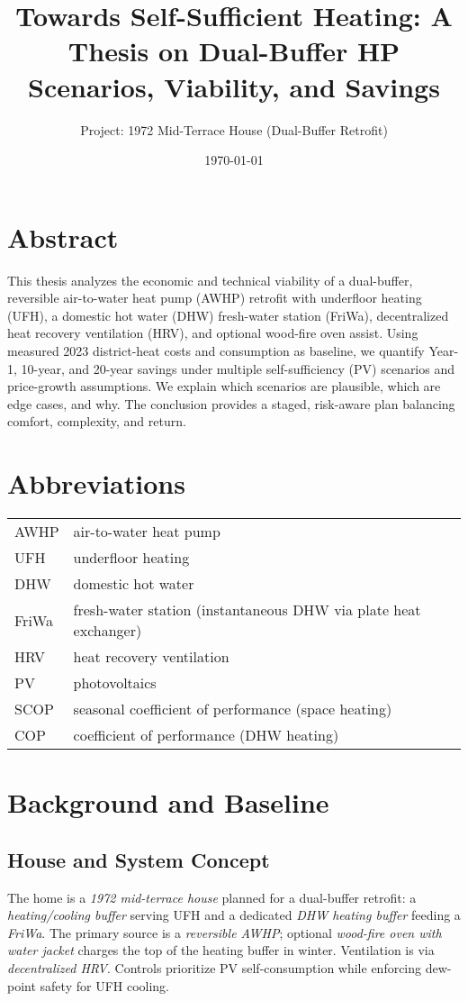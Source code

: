 \documentclass[12pt,oneside]{report}
\title{Towards Self-Sufficient Heating: A Thesis on Dual-Buffer HP Scenarios, Viability, and Savings}
\author{Project: 1972 Mid-Terrace House (Dual-Buffer Retrofit)}
\date{\today}
\begin{document}
\maketitle
\tableofcontents
\clearpage

\chapter*{Abstract}
This thesis analyzes the economic and technical viability of a dual-buffer, reversible air-to-water heat pump (AWHP) retrofit with underfloor heating (UFH), a domestic hot water (DHW) fresh-water station (FriWa), decentralized heat recovery ventilation (HRV), and optional wood-fire oven assist. Using measured 2023 district-heat costs and consumption as baseline, we quantify Year-1, 10-year, and 20-year savings under multiple self-sufficiency (PV) scenarios and price-growth assumptions. We explain which scenarios are plausible, which are edge cases, and why. The conclusion provides a staged, risk-aware plan balancing comfort, complexity, and return.

\chapter{Abbreviations}
\begin{longtable}{@{}ll@{}}
\toprule
AWHP & air-to-water heat pump \\
UFH & underfloor heating \\
DHW & domestic hot water \\
FriWa & fresh-water station (instantaneous DHW via plate heat exchanger) \\
HRV & heat recovery ventilation \\
PV & photovoltaics \\
SCOP & seasonal coefficient of performance (space heating) \\
COP & coefficient of performance (DHW heating) \\
\bottomrule
\end{longtable}

\chapter{Background and Baseline}
\section{House and System Concept}
The home is a \emph{1972 mid-terrace house} planned for a dual-buffer retrofit: a \emph{heating/cooling buffer} serving UFH and a dedicated \emph{DHW heating buffer} feeding a \emph{FriWa}. The primary source is a \emph{reversible AWHP}; optional \emph{wood-fire oven with water jacket} charges the top of the heating buffer in winter. Ventilation is via \emph{decentralized HRV}. Controls prioritize PV self-consumption while enforcing dew-point safety for UFH cooling.
\end{document}
